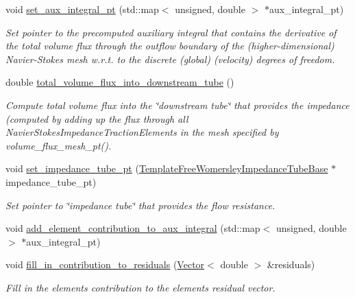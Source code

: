 \begin{DoxyCompactItemize}
void \hyperlink{classoomph_1_1NavierStokesImpedanceTractionElement_abd5db43a552949e7d2ab4c1c25a68e96}{set\+\_\+aux\+\_\+integral\+\_\+pt} (std\+::map$<$ unsigned, double $>$ $\ast$aux\+\_\+integral\+\_\+pt)
\begin{DoxyCompactList}\small\item\em Set pointer to the precomputed auxiliary integral that contains the derivative of the total volume flux through the outflow boundary of the (higher-\/dimensional) Navier-\/\+Stokes mesh w.\+r.\+t. to the discrete (global) (velocity) degrees of freedom. \end{DoxyCompactList}\item 
double \hyperlink{classoomph_1_1NavierStokesImpedanceTractionElement_ade2eae5b0a6ecac82949f05a073217ea}{total\+\_\+volume\+\_\+flux\+\_\+into\+\_\+downstream\+\_\+tube} ()
\begin{DoxyCompactList}\small\item\em Compute total volume flux into the \char`\"{}downstream tube\char`\"{} that provides the impedance (computed by adding up the flux through all Navier\+Stokes\+Impedance\+Traction\+Elements in the mesh specified by volume\+\_\+flux\+\_\+mesh\+\_\+pt(). \end{DoxyCompactList}\item 
void \hyperlink{classoomph_1_1NavierStokesImpedanceTractionElement_aab0f649a0569d9caa428b8a932cc1c40}{set\+\_\+impedance\+\_\+tube\+\_\+pt} (\hyperlink{classoomph_1_1TemplateFreeWomersleyImpedanceTubeBase}{Template\+Free\+Womersley\+Impedance\+Tube\+Base} $\ast$impedance\+\_\+tube\+\_\+pt)
\begin{DoxyCompactList}\small\item\em Set pointer to \char`\"{}impedance tube\char`\"{} that provides the flow resistance. \end{DoxyCompactList}\item 
void \hyperlink{classoomph_1_1NavierStokesImpedanceTractionElement_addae9a132e1004423ce501f71a84fe07}{add\+\_\+element\+\_\+contribution\+\_\+to\+\_\+aux\+\_\+integral} (std\+::map$<$ unsigned, double $>$ $\ast$aux\+\_\+integral\+\_\+pt)
\item 
void \hyperlink{classoomph_1_1NavierStokesImpedanceTractionElement_a59864479b537aae999dceaa38e8856ef}{fill\+\_\+in\+\_\+contribution\+\_\+to\+\_\+residuals} (\hyperlink{classoomph_1_1Vector}{Vector}$<$ double $>$ \&residuals)
\begin{DoxyCompactList}\small\item\em Fill in the element\textquotesingle{}s contribution to the element\textquotesingle{}s residual vector. \end{DoxyCompactList}\item 

\end{DoxyCompactItemize}
